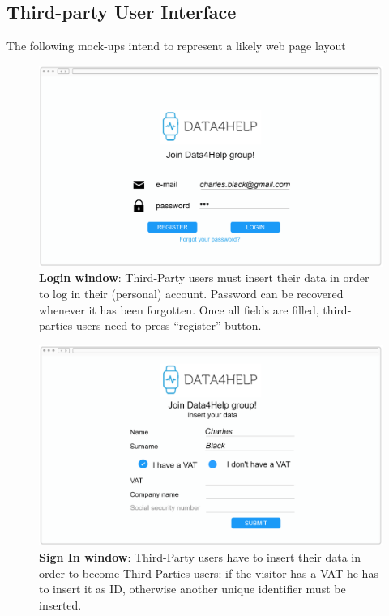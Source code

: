 \subsection{Third-party User Interface}
The following mock-ups intend to represent a likely web page layout 

\begin{figure}[H]
\centering
\includegraphics[scale = 0.5]{Mocks/Desktop_Login.PNG}
\caption{\textbf{Login window}: Third-Party users must insert their data in order to log in their (personal) account. Password can be recovered whenever it has been forgotten. Once all fields are filled, third-parties users need to press “register” button.}
\end{figure}

\begin{figure}[H]
\centering
\includegraphics[scale = 0.5]{Mocks/Desktop_Sign_In.PNG}
\caption{\textbf{Sign In window}: Third-Party users have to insert their data in order to become Third-Parties users: if the visitor has a VAT he has to insert it as ID, otherwise another unique identifier must be inserted.}
\end{figure}

